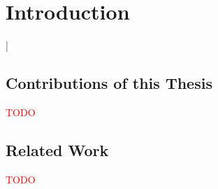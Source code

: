 \documentclass[english,version-2019-07]{uzl-thesis}
\begin{document}
%
%



\chapter{Introduction}



%
\lstMakeShortInline[style=code,style=inline,language={[LaTeX]tex},moretexcs={chapter}]|
 


\section{Contributions of this Thesis}

%
\textcolor{red}{TODO}


\section{Related Work}

%

\textcolor{red}{TODO}
\end{document}
